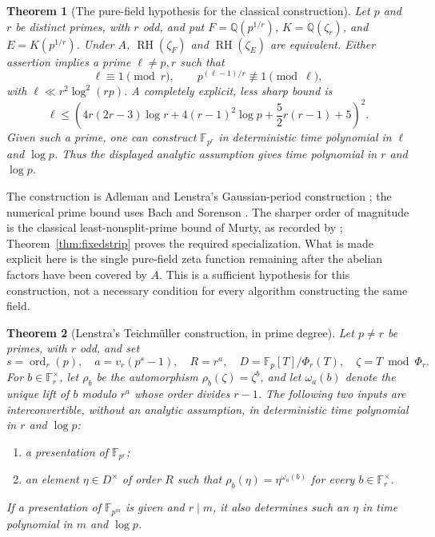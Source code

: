 \documentclass[11pt]{article}
\newcommand{\Q}{\mathbb Q}
\newcommand{\F}{\mathbb F}
\newcommand{\ord}{\operatorname{ord}}
\newcommand{\RH}{\operatorname{RH}}
\newtheorem{theorem}{Theorem}[section]
\theoremstyle{definition}
\theoremstyle{remark}
\begin{document}
\begin{theorem}[The pure-field hypothesis for the classical construction]
\label{thm:kummer}
Let $p$ and $r$ be distinct primes, with $r$ odd, and put
$F=\Q(p^{1/r})$, $K=\Q(\zeta_r)$, and $E=K(p^{1/r})$.
Under $A$, $\RH(\zeta_F)$ and $\RH(\zeta_E)$ are equivalent.
Either assertion implies a prime $\ell\ne p,r$ such that
\[
 \ell\equiv1\pmod r,\qquad p^{(\ell-1)/r}\not\equiv1\pmod\ell,
\]
with $\ell\ll r^2\log^2(rp)$. A completely explicit, less sharp
bound is
\begin{equation}\label{eq:bound}
 \ell\le \left(4r(2r-3)\log r+4(r-1)^2\log p
             +\frac52r(r-1)+5\right)^2.
\end{equation}
Given such a prime, one can construct $\F_{p^r}$ in deterministic time
polynomial in $\ell$ and $\log p$.  Thus the displayed analytic assumption
gives time polynomial in $r$ and $\log p$.
\end{theorem}

The construction is Adleman and Lenstra's Gaussian-period construction
\citep[Algorithm A, pp.~350--351]{AdlemanLenstra1986}; the numerical
prime bound uses Bach and Sorenson \citep[Theorem~5.1, p.~1729]{BachSorenson1996}.
The sharper order of magnitude is the classical least-nonsplit-prime
bound of Murty, as recorded by \citet[p.~1, equation~(1.2)]{Zaman2018};
Theorem~\ref{thm:fixedstrip} proves the required specialization.
What is made explicit here is the single pure-field zeta function remaining
after the abelian factors have been covered by $A$.
This is a sufficient hypothesis for this construction, not a necessary
condition for every algorithm constructing the same field.

\begin{theorem}[Lenstra's Teichm\"uller construction, in prime degree]
\label{thm:teich}
Let $p\ne r$ be primes, with $r$ odd, and set
\[
 s=\ord_r(p),\quad a=v_r(p^s-1),\quad R=r^a,
 \quad D=\F_p[T]/\Phi_r(T),\quad \zeta=T\bmod\Phi_r.
\]
For $b\in\F_r^\times$, let $\rho_b$ be the automorphism
$\rho_b(\zeta)=\zeta^b$, and let $\omega_a(b)$ denote the unique
lift of $b$ modulo $r^a$ whose order divides $r-1$.
The following two inputs are interconvertible, without an analytic
assumption, in deterministic time polynomial in $r$ and $\log p$:
\begin{enumerate}
\item a presentation of $\F_{p^r}$;
\item an element $\eta\in D^\times$ of order $R$ such that
$\rho_b(\eta)=\eta^{\omega_a(b)}$ for every $b\in\F_r^\times$.
\end{enumerate}
If a presentation of $\F_{p^m}$ is given and $r\mid m$, it also
determines such an $\eta$ in time polynomial in $m$ and $\log p$.
\end{theorem}
\end{document}
